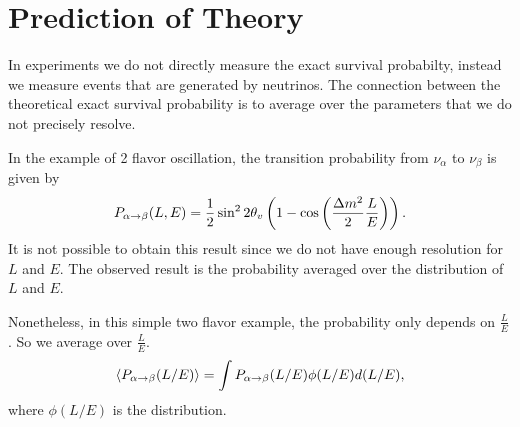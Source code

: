 \documentclass[letterpaper,12pt,english]{sphinxmanual}
\begin{document}

\section{Prediction of Theory}
\label{experiments:prediction-of-theory}\label{experiments:index-0}
In experiments we do not directly measure the exact survival probabilty, instead we measure events that are generated by neutrinos. The connection between the theoretical exact survival probability is to average over the parameters that we do not precisely resolve.

In the example of 2 flavor oscillation, the transition probability from \(\nu_\alpha\) to \(\nu_\beta\) is given by
\begin{gather}
\begin{split}P_{\alpha\to\beta}(L,E) = \frac{1}{2}\sin^2 2\theta_v\left( 1 - \cos\left( \frac{\Delta m^2}{2}\frac{L}{E} \right) \right).\end{split}\notag
\end{gather}
It is not possible to obtain this result since we do not have enough resolution for \(L\) and \(E\). The observed result is the probability averaged over the distribution of \(L\) and \(E\). \footnotemark[1]

Nonetheless, in this simple two flavor example, the probability only depends on \(\frac{L}{E}\). So we average over \(\frac{L}{E}\). \footnotemark[1]
\begin{gather}
\begin{split}\langle P_{\alpha\to\beta}(L/E) \rangle = \int P_{\alpha\to\beta}(L/E) \phi(L/E) d(L/E),\end{split}\notag
\end{gather}
where \(\phi(L/E)\) is the distribution.
\end{document}
